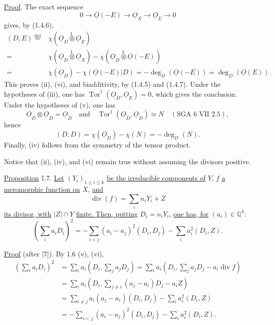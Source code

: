 \underline{Proof}. The exact sequence
\begin{equation*}
0\longrightarrow\underline O(-E)\longrightarrow\underline O_X
\longrightarrow\underline O_E\longrightarrow0
\end{equation*}
gives, by (1.4.6),
\begin{equation*}
\begin{array}{rl}
(D,E)\overset{\mathrm{def}}{=}&
\chi(\underline{O}_D\overset{\mathbb L}{\otimes}\underline{O}_E)\\
=&\chi(\underline{O}_D\overset{\mathbb L}{\otimes}\underline{O}_X)
-\chi(\underline{O}_D\overset{\mathbb L}{\otimes}\underline O(-E))\\[1ex]
=&\chi(\underline{O}_D)-\chi(\underline O(-E)|D)
=-\deg_D(\underline O(-E))=\deg_D(\underline O(E)).
\end{array}
\end{equation*}
This proves (ii), (vi), and biadditivity, by (1.4.5) and (1.4.7).  Under the
hypotheses of (iii), one has
$\operatorname{Tor}^1(\underline{O}_D,\underline{O}_E)=0$, which gives the
conclusion.  Under the hypotheses of (v), one has
\begin{equation*}
\underline{O}_D\otimes\underline{O}_D=\underline{O}_D
\quad\text{and}\quad
\operatorname{Tor}^1(\underline{O}_D,\underline{O}_D)\simeq N
\quad(\text{SGA 6 VII 2.5}),
\end{equation*}
hence
\begin{equation*}
(D,D)=\chi(\underline{O}_D)-\chi(N)=-\deg_D(N).
\end{equation*}
Finally, (iv) follows from the symmetry of the tensor product.

Notice that (ii), (iv), and (vi) remain true without assuming the divisors positive.


\underline{Proposition} 1.7. \underline{Let} $(Y_i)_{1\leq i\leq k}$
\underline{be the irreducible components of} $Y$, $f$ \underline{a meromorphic
function on} $X$, \underline{and}
\begin{equation*}
\operatorname{div}(f)=\sum_i n_iY_i+Z
\end{equation*}
\underline{its divisor, with} $|Z|\cap Y$ \underline{finite. Then, putting}
$D_i=n_iY_i$, \underline{one has, for} $(a_i)\in\mathbb Q^k$:
\begin{equation*}
\left(\sum_i a_iD_i\right)^2
=-\sum_{i<j}(a_i-a_j)^2(D_i,D_j)-\sum_i a_i^2(D_i,Z).
\end{equation*}

\underline{Proof} (after [7]). By 1.6 (v), (vi),
\begin{equation*}
\begin{aligned}
\left(\sum_i a_iD_i\right)^2
&=\sum_i a_i\left(D_i,\sum_j a_jD_j\right)
=\sum_i a_i\left(D_i,\sum_j a_jD_j-a_i\operatorname{div}f\right)\\
&=\sum_i a_i\left(D_i,\sum_{j\ne i}(a_j-a_i)D_j-a_iZ\right)\\
&=\sum_{i\ne j}a_i(a_j-a_i)(D_i,D_j)-\sum_i a_i^2(D_i,Z)\\
&=-\sum_{i<j}(a_i-a_j)^2(D_i,D_j)-\sum_i a_i^2(D_i,Z).
\end{aligned}
\end{equation*}

